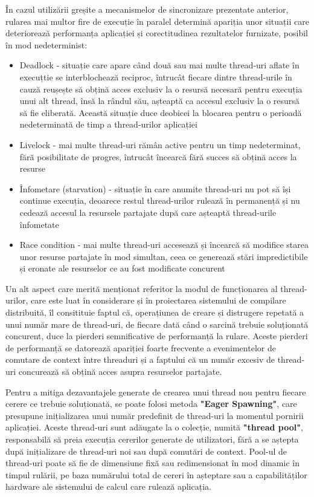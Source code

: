 În cazul utilizării greșite a mecanismelor de sincronizare prezentate anterior, rularea mai multor fire de execuție în paralel
determină apariția unor situații care deteriorează performanța aplicației și corectitudinea rezultatelor furnizate, posibil
în mod nedeterminist:

\begin{itemize}
    \item Deadlock - situație care apare când două sau mai multe thread-uri aflate în execuțtie se interblochează reciproc, întrucât fiecare
    dintre thread-urile în cauză reușește să obțină acces exclusiv la o resursă necesară pentru execuția unui alt thread, însă la rândul său, 
    așteaptă ca accesul exclusiv la o resursă să fie eliberată. Această situație duce deobicei la blocarea pentru o perioadă nedeterminată de
    timp a thread-urilor aplicației
    \item Livelock - mai multe thread-uri rămân active pentru un timp nedeterminat, fără posibilitate de progres, întrucât încearcă fără succes
    să obțină acces la resurse
    \item Înfometare (starvation) - situație în care anumite thread-uri nu pot să își continue execuția, deoarece restul thread-urilor
    rulează în permanență și nu cedează accesul la resursele partajate după care așteaptă thread-urile înfometate
    \item Race condition - mai multe thread-uri accesează și încearcă să modifice starea unor resurse partajate în mod simultan, ceea ce generează
    stări impredictibile și eronate ale resurselor ce au fost modificate concurent
\end{itemize}

Un alt aspect care merită menționat referitor la modul de funcționarea al thread-urilor, care este luat în considerare
și în proiectarea sistemului de compilare distribuită, îl consitituie faptul că, operațiunea de creare și distrugere repetată
a unui număr mare de thread-uri, de fiecare dată când o sarcină trebuie soluționată concurent, duce la pierderi semnificative
de performanță la rulare. Aceste pierderi de performanță se datorează apariției foarte frecvente a evenimentelor de comutare de
context între threaduri și a faptului că un număr excesiv de thread-uri concurează să obțină acces asupra resurselor partajate.

Pentru a mitiga dezavantajele generate de crearea unui thread nou pentru fiecare cerere ce trebuie soluționată, se poate 
folosi metoda \textbf{"Eager Spawning"}\cite{schmidt2001c++}, care presupune inițializarea unui număr predefinit de thread-uri
la momentul pornirii aplicației. Aceste thread-uri sunt adăugate la o colecție, numită \textbf{"thread pool"}, responsabilă 
să preia execuția cererilor generate de utilizatori, fără a se aștepta după inițializare de thread-uri noi sau după comutări de
context. Pool-ul de thread-uri poate să fie de dimensiune fixă sau redimensionat în mod dinamic în timpul rulării, pe baza numărului 
total de cereri în așteptare sau a capabilităților hardware ale sistemului de calcul care rulează aplicația.

